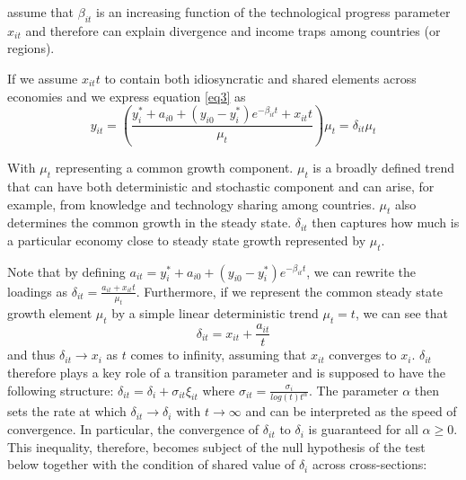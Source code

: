 \documentclass[11pt]{article}
\begin{document}
\citeauthor{phillips2007transition} assume that $\beta_{it}$ is an increasing function of the technological progress parameter $x_{it}$ and therefore can explain divergence and income traps among countries (or regions).

If we assume $x_{it}t$ to contain both idiosyncratic and shared elements across economies and we express equation \eqref{eq3} as
\begin{equation} \label{eq4} y_{it} = \left(\frac{ y_i^* + a_{i0} + (y_{i0} - y_i^*)e^{-\beta_{it}t} + x_{it}t}{\mu_t}\right)\mu_t = \delta_{it}\mu_t  \end{equation}


With $\mu_t$ representing a common growth component.
$\mu_t$ is a broadly defined trend that can have both deterministic and stochastic component and can arise, for example, from knowledge and technology sharing among countries. $\mu_t$ also determines the common growth in the steady state. $\delta_{it}$ then captures how much is a particular economy close to steady state growth represented by $\mu_t$.

Note that by defining \(a_{it} = y_i^* + a_{i0} + (y_{i0} - y_i^*)e^{-\beta_{it}t} \), we can rewrite the loadings as \(\delta_{it} = \frac{a_{it} + x_{it}t}{\mu_t}\). Furthermore, if we represent the common steady state growth element $\mu_t$ by a simple linear deterministic trend \(\mu_t = t\), we can see that
\begin{equation} \label{eq5}\delta_{it} = x_{it} + \frac{a_{it}}{t} \end{equation}  and thus \(\delta_{it} \rightarrow x_i\) as $t$ comes to infinity, assuming that $x_{it}$ converges to $x_{i}$. $\delta_{it}$ therefore plays a key role of a transition parameter and is supposed to have the following structure: \(\delta_{it} = \delta_{i} + \sigma_{it}\xi_{it}\) where \( \sigma_{it} = \frac{\sigma_{i}}{log(t)t^\alpha}\). The parameter $\alpha$ then sets the rate at which \(\delta_{it} \rightarrow \delta_{i}\) with \(t \rightarrow \infty\) and can be interpreted as the speed of convergence. In particular, the convergence of $\delta_{it}$ to $\delta_{i}$ is guaranteed for all \(\alpha \geq 0\). This inequality, therefore, becomes subject of the null hypothesis of the test below together with the condition of shared value of $\delta_{i}$ across cross-sections: 
\end{document}
